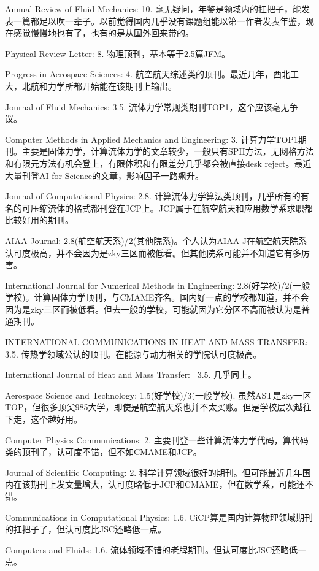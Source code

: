 \documentclass{book}
\begin{document}
Annual Review of Fluid Mechanics: 10. 毫无疑问，年鉴是领域内的扛把子，能发表一篇都足以吹一辈子。以前觉得国内几乎没有课题组能以第一作者发表年鉴，现在感觉慢慢地也有了，也有的是从国外回来带的。

Physical Review Letter: 8. 物理顶刊，基本等于2.5篇JFM。

Progress in Aerospace Sciences: 4. 航空航天综述类的顶刊。最近几年，西北工大，北航和力学所都开始能在该期刊上输出。

Journal of Fluid Mechanics: 3.5. 流体力学常规类期刊TOP1，这个应该毫无争议。

Computer Methods in Applied Mechanics and Engineering: 3. 计算力学TOP1期刊。主要是固体力学，计算流体力学的文章较少，一般只有SPH方法，无网格方法和有限元方法有机会登上，有限体积和有限差分几乎都会被直接desk reject。最近大量刊登AI for Science的文章，影响因子一路飙升。

Journal of Computational Physics: 2.8. 计算流体力学算法类顶刊，几乎所有的有名的可压缩流体的格式都刊登在JCP上。JCP属于在航空航天和应用数学系求职都比较好用的期刊。

AIAA Journal: 2.8(航空航天系)/2(其他院系)。个人认为AIAA J在航空航天院系认可度极高，并不会因为是zky三区而被低看。但其他院系可能并不知道它有多厉害。

International Journal for Numerical Methods in Engineering: 2.8(好学校)/2(一般学校)。计算固体力学顶刊，与CMAME齐名。国内好一点的学校都知道，并不会因为是zky三区而被低看。但去一般的学校，可能就因为它分区不高而被认为是普通期刊。

INTERNATIONAL COMMUNICATIONS IN HEAT AND MASS TRANSFER: 3.5. 传热学领域公认的顶刊。在能源与动力相关的学院认可度极高。

International Journal of Heat and Mass Transfer:  3.5. 几乎同上。

Aerospace Science and Technology: 1.5(好学校)/3(一般学校). 虽然AST是zky一区TOP，但很多顶尖985大学，即使是航空航天系也并不太买账。但是学校层次越往下走，这个越好用。

Computer Physics Communications: 2. 主要刊登一些计算流体力学代码，算代码类的顶刊了，认可度不错，但不如CMAME和JCP。

Journal of Scientific Computing: 2. 科学计算领域很好的期刊。但可能最近几年国内在该期刊上发文量增大，认可度略低于JCP和CMAME，但在数学系，可能还不错。

Communications in Computational Physics: 1.6. CiCP算是国内计算物理领域期刊的扛把子了，但认可度比JSC还略低一点。

Computers and Fluids: 1.6. 流体领域不错的老牌期刊。但认可度比JSC还略低一点。
\end{document}
